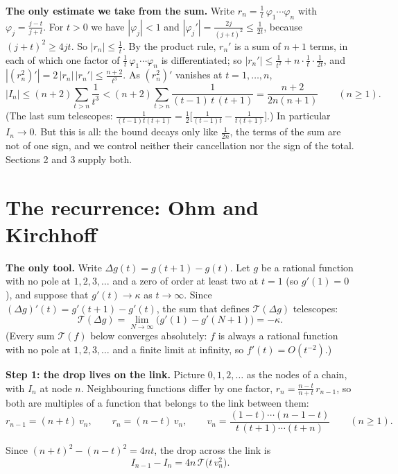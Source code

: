\documentclass[11pt]{article}
\newcommand{\T}{\mathcal T}
\newcommand{\q}[1]{\medskip\noindent\textbf{#1}}
\begin{document}
\q{The only estimate we take from the sum.} Write $r_n=\frac1t\,\varphi_1\cdots\varphi_n$ with
$\varphi_j=\frac{j-t}{j+t}$. For $t>0$ we have $|\varphi_j|<1$ and
$|\varphi_j'|=\frac{2j}{(j+t)^2}\le\frac1{2t}$, because $(j+t)^2\ge4jt$. So $|r_n|\le\frac1t$. By the
product rule, $r_n'$ is a sum of $n+1$ terms, in each of which one factor of
$\frac1t\,\varphi_1\cdots\varphi_n$ is differentiated; so
$|r_n'|\le\frac1{t^2}+n\cdot\frac1t\cdot\frac1{2t}$, and $|(r_n^2)'|=2\,|r_n|\,|r_n'|\le\frac{n+2}{t^3}$. As
$(r_n^2)'$ vanishes at $t=1,\dots,n$,
\begin{equation}\label{bdd}
|I_n|\le(n+2)\sum_{t>n}\frac1{t^3}<(n+2)\sum_{t>n}\frac1{(t-1)\,t\,(t+1)}=\frac{n+2}{2n(n+1)}\qquad(n\ge1).
\end{equation}
(The last sum telescopes: $\frac1{(t-1)t(t+1)}=\frac12\bigl[\frac1{(t-1)t}-\frac1{t(t+1)}\bigr]$.) In
particular $I_n\to0$. But this is all: the bound decays only like $\frac1{2n}$, the terms of the sum
are not of one sign, and we control neither their cancellation nor the sign of the total. Sections
2 and 3 supply both.

\section{The recurrence: Ohm and Kirchhoff}

\q{The only tool.} Write $\Delta g(t)=g(t+1)-g(t)$. Let $g$ be a rational function with no pole at
$1,2,3,\dots$ and a zero of order at least two at $t=1$ (so $g'(1)=0$), and suppose that
$g'(t)\to\kappa$ as $t\to\infty$. Since $(\Delta g)'(t)=g'(t+1)-g'(t)$, the sum that defines
$\T(\Delta g)$ telescopes:
\begin{equation}\label{tel}
\T(\Delta g)=\lim_{N\to\infty}\bigl(g'(1)-g'(N+1)\bigr)=-\kappa .
\end{equation}
(Every sum $\T(f)$ below converges absolutely: $f$ is always a rational function with no pole at
$1,2,3,\dots$ and a finite limit at infinity, so $f'(t)=O(t^{-2})$.)

\q{Step 1: the drop lives on the link.} Picture $0,1,2,\dots$ as the nodes of a chain, with $I_n$
at node $n$. Neighbouring functions differ by one factor, $r_n=\frac{n-t}{n+t}\,r_{n-1}$, so both
are multiples of a function that belongs to the link between them:
\[
r_{n-1}=(n+t)\,v_n,\qquad r_n=(n-t)\,v_n,\qquad v_n=\frac{(1-t)\cdots(n-1-t)}{t\,(t+1)\cdots(t+n)}\qquad(n\ge1).
\]
\begin{center}
\end{center}
Since $(n+t)^2-(n-t)^2=4nt$, the drop across the link is
\begin{equation}\label{drop}
I_{n-1}-I_n=4n\,\T\bigl(t\,v_n^2\bigr).
\end{equation}
\end{document}
